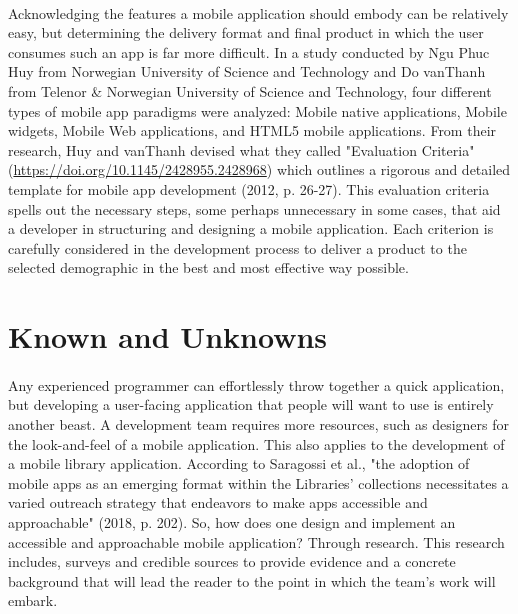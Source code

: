 \paragraph{}
Acknowledging the features a mobile application should embody can be relatively easy, but determining the delivery format and final product in which the user consumes such an app is far more difficult. In a study conducted by Ngu Phuc Huy from Norwegian University of Science and Technology and Do vanThanh from Telenor \& Norwegian University of Science and Technology, four different types of mobile app paradigms were analyzed: Mobile native applications, Mobile widgets, Mobile Web applications, and HTML5 mobile applications. From their research, Huy and vanThanh devised what they called "Evaluation Criteria" (\url{https://doi.org/10.1145/2428955.2428968}) which outlines a rigorous and detailed template for mobile app development (2012, p. 26-27). This evaluation criteria spells out the necessary steps, some perhaps unnecessary in some cases, that aid a developer in structuring and designing a mobile application. Each criterion is carefully considered in the development process to deliver a product to the selected demographic in the best and most effective way possible.



\section{Known and Unknowns}

    \paragraph{}
    Any experienced programmer can effortlessly throw together a quick application, but developing a user-facing application that people will want to use is entirely another beast. A development team requires more resources, such as designers for the look-and-feel of a mobile application. This also applies to the development of a mobile library application. According to Saragossi et al., "the adoption of mobile apps as an emerging format within the Libraries’ collections necessitates a varied outreach strategy that endeavors to make apps accessible and approachable" (2018, p. 202). So, how does one design and implement an accessible and approachable mobile application? Through research. This research includes, surveys and credible sources to provide evidence and a concrete background that will lead the reader to the point in which the team's work will embark.
    

